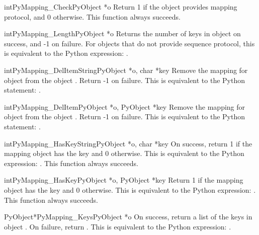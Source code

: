      \begin{cfuncdesc}{int}{PyMapping_Check}{PyObject *o}
         Return 1 if the object provides mapping protocol, and 0
	 otherwise.  
	 This function always succeeds.
     \end{cfuncdesc}


     \begin{cfuncdesc}{int}{PyMapping_Length}{PyObject *o}
         Returns the number of keys in object  on success, and -1 on
	 failure.  For objects that do not provide sequence protocol,
	 this is equivalent to the Python expression: .
     \end{cfuncdesc}


     \begin{cfuncdesc}{int}{PyMapping_DelItemString}{PyObject *o, char *key}
	 Remove the mapping for object  from the object .
	 Return -1 on failure.  This is equivalent to
	 the Python statement: .
     \end{cfuncdesc}


     \begin{cfuncdesc}{int}{PyMapping_DelItem}{PyObject *o, PyObject *key}
	 Remove the mapping for object  from the object .
	 Return -1 on failure.  This is equivalent to
	 the Python statement: .
     \end{cfuncdesc}


     \begin{cfuncdesc}{int}{PyMapping_HasKeyString}{PyObject *o, char *key}
	 On success, return 1 if the mapping object has the key 
	 and 0 otherwise.  This is equivalent to the Python expression:
	 . 
	 This function always succeeds.
     \end{cfuncdesc}


     \begin{cfuncdesc}{int}{PyMapping_HasKey}{PyObject *o, PyObject *key}
	 Return 1 if the mapping object has the key 
	 and 0 otherwise.  This is equivalent to the Python expression:
	 . 
	 This function always succeeds.
     \end{cfuncdesc}


     \begin{cfuncdesc}{PyObject*}{PyMapping_Keys}{PyObject *o}
         On success, return a list of the keys in object .  On
	 failure, return {\NULL}. This is equivalent to the Python
	 expression: .
     \end{cfuncdesc}


